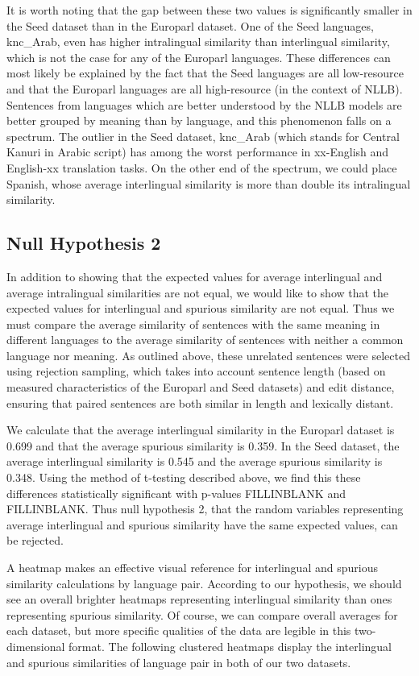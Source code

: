 It is worth noting that the gap between these two values is significantly smaller in the Seed dataset than in the Europarl dataset. One of the Seed languages, knc\_Arab, even has higher intralingual similarity than interlingual similarity, which is not the case for any of the Europarl languages. These differences can most likely be explained by the fact that the Seed languages are all low-resource and that the Europarl languages are all high-resource (in the context of NLLB). Sentences from languages which are better understood by the NLLB models are better grouped by meaning than by language, and this phenomenon falls on a spectrum. The outlier in the Seed dataset, knc\_Arab (which stands for Central Kanuri in Arabic script) has among the worst performance in xx-English and English-xx translation tasks. On the other end of the spectrum, we could place Spanish, whose average interlingual similarity is more than double its intralingual similarity.


\subsection{Null Hypothesis 2}
In addition to showing that the expected values for average interlingual and average intralingual similarities are not equal, we would like to show that the expected values for interlingual and spurious similarity are not equal. Thus we must compare the average similarity of sentences with the same meaning in different languages to the average similarity of sentences with neither a common language nor meaning. As outlined above, these unrelated sentences were selected using rejection sampling, which takes into account sentence length (based on measured characteristics of the Europarl and Seed datasets) and edit distance, ensuring that paired sentences are both similar in length and lexically distant. 

We calculate that the average interlingual similarity in the Europarl dataset is 0.699 and that the average spurious similarity is 0.359. In the Seed dataset, the average interlingual similarity is 0.545 and the average spurious similarity is 0.348. Using the method of t-testing described above, we find this these differences statistically significant with p-values FILLINBLANK and FILLINBLANK. Thus null hypothesis 2, that the random variables representing average interlingual and spurious similarity have the same expected values, can be rejected. 

A heatmap makes an effective visual reference for interlingual and spurious similarity calculations by language pair. According to our hypothesis, we should see an overall brighter heatmaps representing interlingual similarity than ones representing spurious similarity. Of course, we can compare overall averages for each dataset, but more specific qualities of the data are legible in this two-dimensional format. The following clustered heatmaps display the interlingual and spurious similarities of language pair in both of our two datasets. 

